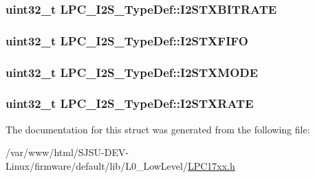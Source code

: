 \subsubsection[{\texorpdfstring{I2\+S\+T\+X\+B\+I\+T\+R\+A\+TE}{I2STXBITRATE}}]{ uint32\+\_\+t L\+P\+C\+\_\+\+I2\+S\+\_\+\+Type\+Def\+::\+I2\+S\+T\+X\+B\+I\+T\+R\+A\+TE}\hypertarget{structLPC__I2S__TypeDef_a8e85831e05c576f7f4611e45c38dad75}{}\label{structLPC__I2S__TypeDef_a8e85831e05c576f7f4611e45c38dad75}
\subsubsection[{\texorpdfstring{I2\+S\+T\+X\+F\+I\+FO}{I2STXFIFO}}]{ uint32\+\_\+t L\+P\+C\+\_\+\+I2\+S\+\_\+\+Type\+Def\+::\+I2\+S\+T\+X\+F\+I\+FO}\hypertarget{structLPC__I2S__TypeDef_a2d49566bdca12980b001175683fe0fde}{}\label{structLPC__I2S__TypeDef_a2d49566bdca12980b001175683fe0fde}
\subsubsection[{\texorpdfstring{I2\+S\+T\+X\+M\+O\+DE}{I2STXMODE}}]{ uint32\+\_\+t L\+P\+C\+\_\+\+I2\+S\+\_\+\+Type\+Def\+::\+I2\+S\+T\+X\+M\+O\+DE}\hypertarget{structLPC__I2S__TypeDef_a61f677e1ab7fe967b8a491abaf272c2e}{}\label{structLPC__I2S__TypeDef_a61f677e1ab7fe967b8a491abaf272c2e}
\subsubsection[{\texorpdfstring{I2\+S\+T\+X\+R\+A\+TE}{I2STXRATE}}]{ uint32\+\_\+t L\+P\+C\+\_\+\+I2\+S\+\_\+\+Type\+Def\+::\+I2\+S\+T\+X\+R\+A\+TE}\hypertarget{structLPC__I2S__TypeDef_ac35b10a16f9f7276b679a4470a1ddcad}{}\label{structLPC__I2S__TypeDef_ac35b10a16f9f7276b679a4470a1ddcad}


The documentation for this struct was generated from the following file\+:\begin{DoxyCompactItemize}
\item 
/var/www/html/\+S\+J\+S\+U-\/\+D\+E\+V-\/\+Linux/firmware/default/lib/\+L0\+\_\+\+Low\+Level/\hyperlink{LPC17xx_8h}{L\+P\+C17xx.\+h}\end{DoxyCompactItemize}
